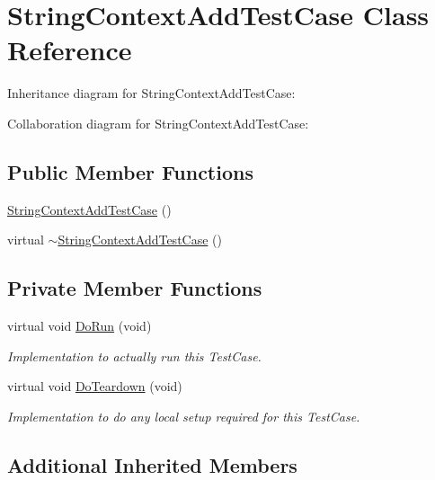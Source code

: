 \hypertarget{classStringContextAddTestCase}{}\section{String\+Context\+Add\+Test\+Case Class Reference}
\label{classStringContextAddTestCase}


Inheritance diagram for String\+Context\+Add\+Test\+Case\+:


Collaboration diagram for String\+Context\+Add\+Test\+Case\+:
\subsection*{Public Member Functions}
\begin{DoxyCompactItemize}
\item 
\hyperlink{classStringContextAddTestCase_a51cdb90918ddbab669ee07f0321016dd}{String\+Context\+Add\+Test\+Case} ()
\item 
virtual \hyperlink{classStringContextAddTestCase_a09dfba709b0595e8ca7e261c320909bd}{$\sim$\+String\+Context\+Add\+Test\+Case} ()
\end{DoxyCompactItemize}
\subsection*{Private Member Functions}
\begin{DoxyCompactItemize}
\item 
virtual void \hyperlink{classStringContextAddTestCase_a57607316fff4039343af119b543f8bdc}{Do\+Run} (void)
\begin{DoxyCompactList}\small\item\em Implementation to actually run this Test\+Case. \end{DoxyCompactList}\item 
virtual void \hyperlink{classStringContextAddTestCase_a414738d1951fe6942d324303ea2a59e5}{Do\+Teardown} (void)
\begin{DoxyCompactList}\small\item\em Implementation to do any local setup required for this Test\+Case. \end{DoxyCompactList}\end{DoxyCompactItemize}
\subsection*{Additional Inherited Members}


